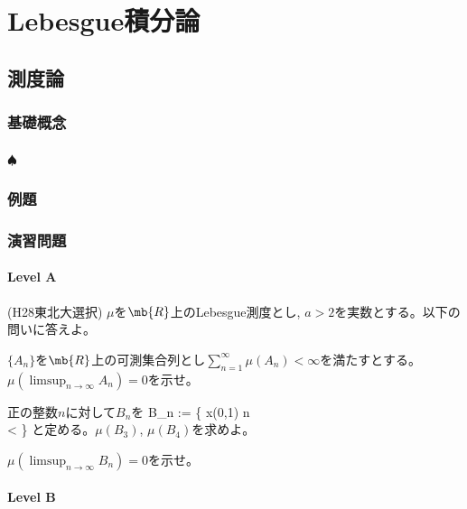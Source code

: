 \chapter{Lebesgue積分論}
\section{測度論}
\subsection{基礎概念}
\subsubsection{}
\subsubsection{$\spadesuit$}


\subsection{例題}


\subsection{演習問題}
\subsubsection{Level A}
\begin{prob} (H28東北大選択)
$\mu$を$\mb{R}$上のLebesgue測度とし, $a>2$を実数とする。以下の問いに答えよ。
\ben
\item $\{ A_n \}$を$\mb{R}$上の可測集合列とし$\sum_{n=1}^{\infty}\mu(A_n) < \infty$を満たすとする。$\mu(\limsup_{n\to \infty} A_n) = 0$を示せ。
\item 正の整数$n$に対して$B_n$を
\beqn
B_n := \{ x\in (0,1) \mid n\\
  <  \}
\eeqn
と定める。$\mu(B_3)$, $\mu(B_4)$を求めよ。
\item $\mu(\limsup_{n\to \infty} B_n) = 0$を示せ。
\een
\end{prob}
\subsubsection{Level B}


